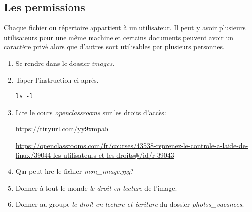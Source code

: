 \documentclass[a4paper,11pt]{article}
\begin{document}
\begin{Form}
\section{Les permissions}
Chaque fichier ou répertoire appartient à un utilisateur. Il peut y avoir plusieurs utilisateurs pour une même machine et certains documents peuvent avoir un caractère privé alors que d'autres sont utilisables par plusieurs personnes.
\begin{activite}
\begin{enumerate}
\item Se rendre dans le dossier \emph{images}.
\item Taper l'instruction ci-après.
\begin{lstlisting}
ls -l
\end{lstlisting}
\item Lire le cours \emph{openclassrooms} sur les droits d'accès:
\begin{center}
\url{https://tinyurl.com/yy9xmpa5}
\begin{commentprof}
\url{https://openclassrooms.com/fr/courses/43538-reprenez-le-controle-a-laide-de-linux/39044-les-utilisateurs-et-les-droits#/id/r-39043}
\end{commentprof}
\end{center}
\item Qui peut lire le fichier \emph{mon\_image.jpg}?
\item Donner à tout le monde \emph{le droit en lecture} de l'image.
\item Donner au groupe \emph{le droit en lecture et écriture} du dossier \emph{photos\_vacances}.
\end{enumerate}
\end{activite}
\end{Form}
\end{document}
